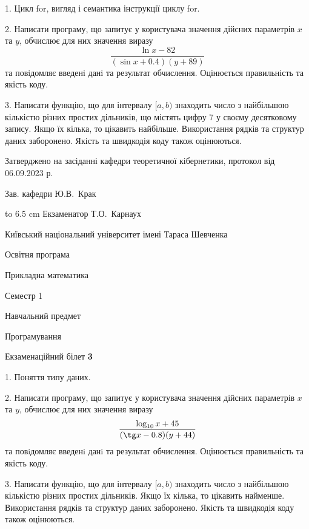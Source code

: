 \documentclass[12pt, ukrainian]{article}
\begin{document}
{%
1. Цикл for, вигляд і семантика інструкції циклу for.%
\par
2. Написати програму, що запитує у користувача значення дійсних параметрів $x$ та $y$, обчислює для них значення виразу 
$$\frac{\ln x - 82}{(\sin x + 0.4) (y + 89)}$$ 
та повiдомляє введенi данi та результат обчислення.
 Оцінюється правильність та якість коду.

\par
3. Написати функцію, що для інтервалу $[a, b)$ знаходить число з найбільшою кількістю різних простих дільників, що містять цифру 7 у своєму десятковому запису. Якщо їх кілька, то цікавить найбільше.  Використання рядків та структур даних заборонено. Якість та швидкодія коду також оцінюються. 

}
{\smallskip\smallskip \begin {scriptsize} Затверджено на засіданні кафедри теоретичної кібернетики, протокол   від   06.09.2023 р.\par\smallskip\smallskip\smallskip\smallskip
{\parbox {6.5 cm} {Зав. кафедри \dotfill Ю.В.~Крак}}\hspace {0.7cm} {\hbox to 6.5 cm { Екзаменатор \dotfill Т.О.~Карнаух}} \end{scriptsize}}
\vspace{0.9cm}
{{\begin {scriptsize}\par
{ \center  Київський національний університет імені Тараса Шевченка \par}
{\parbox {5 cm}{Освітня програма \hfill}{\parbox {7 cm}{Прикладна математика\hfill}}\parbox {6 cm}{\hfill Семестр 1}}\par
{\parbox {5 cm} {Навчальний предмет \hfill}\parbox {7 cm}{Програмування \hfill}\parbox {6cm}{\hfill}\par}\vspace{-15pt} \end{scriptsize}}{\center Екзаменаційний білет \No \textbf { 3 }\par}}
{%
1. Поняття типу даних.%
\par
2. Написати програму, що запитує у користувача значення дійсних параметрів $x$ та $y$, обчислює для них значення виразу 
$$\frac{\log_{10} x + 45}{(\tg x - 0.8) (y + 44)}$$ 
та повiдомляє введенi данi та результат обчислення.
 Оцінюється правильність та якість коду.

\par
3. Написати функцію, що для інтервалу $[a, b)$ знаходить число з найбільшою кількістю різних простих дільників. Якщо їх кілька, то цікавить найменше.  Використання рядків та структур даних заборонено. Якість та швидкодія коду також оцінюються. 

}
\end{document}
